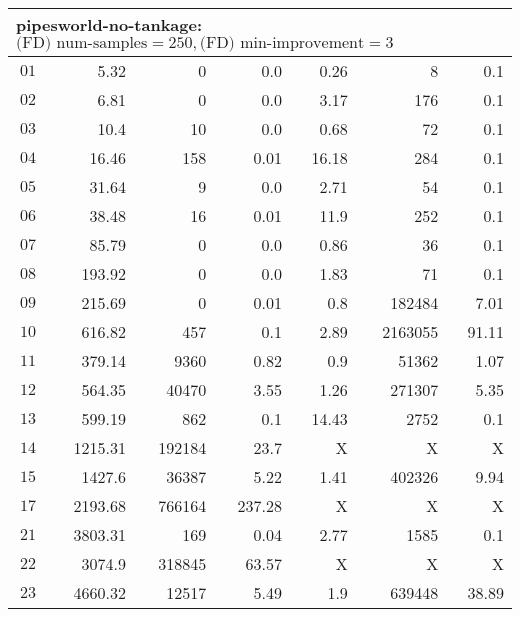 \begin{longtable}{|c||r|r|r||r|r|r|}
\multicolumn{7}{|l|}{pipesworld-no-tankage: $\text{(FD) num-samples}=250,\text{(FD) min-improvement}=3$}\\\hline
$01$ & 5.32 & 0 & 0.0 & 0.26 & 8 & 0.1 \\\hline
$02$ & 6.81 & 0 & 0.0 & 3.17 & 176 & 0.1 \\\hline
$03$ & 10.4 & 10 & 0.0 & 0.68 & 72 & 0.1 \\\hline
$04$ & 16.46 & 158 & 0.01 & 16.18 & 284 & 0.1 \\\hline
$05$ & 31.64 & 9 & 0.0 & 2.71 & 54 & 0.1 \\\hline
$06$ & 38.48 & 16 & 0.01 & 11.9 & 252 & 0.1 \\\hline
$07$ & 85.79 & 0 & 0.0 & 0.86 & 36 & 0.1 \\\hline
$08$ & 193.92 & 0 & 0.0 & 1.83 & 71 & 0.1 \\\hline
$09$ & 215.69 & 0 & 0.01 & 0.8 & 182484 & 7.01 \\\hline
$10$ & 616.82 & 457 & 0.1 & 2.89 & 2163055 & 91.11 \\\hline
$11$ & 379.14 & 9360 & 0.82 & 0.9 & 51362 & 1.07 \\\hline
$12$ & 564.35 & 40470 & 3.55 & 1.26 & 271307 & 5.35 \\\hline
$13$ & 599.19 & 862 & 0.1 & 14.43 & 2752 & 0.1 \\\hline
$14$ & 1215.31 & 192184 & 23.7 & X & X & X \\\hline
$15$ & 1427.6 & 36387 & 5.22 & 1.41 & 402326 & 9.94 \\\hline
$17$ & 2193.68 & 766164 & 237.28 & X & X & X \\\hline
$21$ & 3803.31 & 169 & 0.04 & 2.77 & 1585 & 0.1 \\\hline
$22$ & 3074.9 & 318845 & 63.57 & X & X & X \\\hline
$23$ & 4660.32 & 12517 & 5.49 & 1.9 & 639448 & 38.89 \\\hline


\end{longtable}
